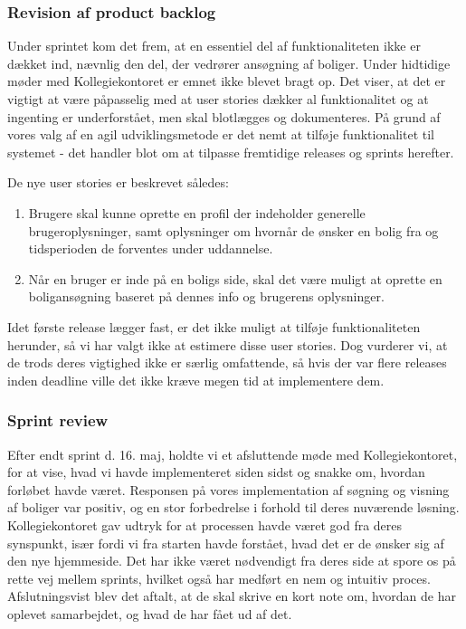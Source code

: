\documentclass[12pt, a4paper]{report}
\begin{document}
\subsubsection{Revision af product backlog}

Under sprintet kom det frem, at en essentiel del af funktionaliteten ikke er dækket ind, nævnlig den del, der vedrører ansøgning af boliger. Under hidtidige møder med Kollegiekontoret er emnet ikke blevet bragt op. Det viser, at det er vigtigt at være påpasselig med at user stories dækker al funktionalitet og at ingenting er underforstået, men skal blotlægges og dokumenteres. På grund af vores valg af en agil udviklingsmetode er det nemt at tilføje funktionalitet til systemet - det handler blot om at tilpasse fremtidige releases og sprints herefter.

De nye user stories er beskrevet således:

\begin{enumerate}

\item Brugere skal kunne oprette en profil der indeholder generelle brugeroplysninger, samt oplysninger om hvornår de ønsker en bolig fra og tidsperioden de forventes under uddannelse.

\item Når en bruger er inde på en boligs side, skal det være muligt at oprette en boligansøgning baseret på dennes info og brugerens oplysninger.

\end{enumerate}

Idet første release lægger fast, er det ikke muligt at tilføje funktionaliteten herunder, så vi har valgt ikke at estimere disse user stories. Dog vurderer vi, at de trods deres vigtighed ikke er særlig omfattende, så hvis der var flere releases inden deadline ville det ikke kræve megen tid at implementere dem.

\subsubsection{Sprint review}

Efter endt sprint d. 16. maj, holdte vi et afsluttende møde med Kollegiekontoret, for at vise, hvad vi havde implementeret siden sidst og snakke om, hvordan forløbet havde været. Responsen på vores implementation af søgning og visning af boliger var positiv, og en stor forbedrelse i forhold til deres nuværende løsning. Kollegiekontoret gav udtryk for at processen havde været god fra deres synspunkt, især fordi vi fra starten havde forstået, hvad det er de ønsker sig af den nye hjemmeside. Det har ikke været nødvendigt fra deres side at spore os på rette vej mellem sprints, hvilket også har medført en nem og intuitiv proces. Afslutningsvist blev det aftalt, at de skal skrive en kort note om, hvordan de har oplevet samarbejdet, og hvad de har fået ud af det.
\end{document}
